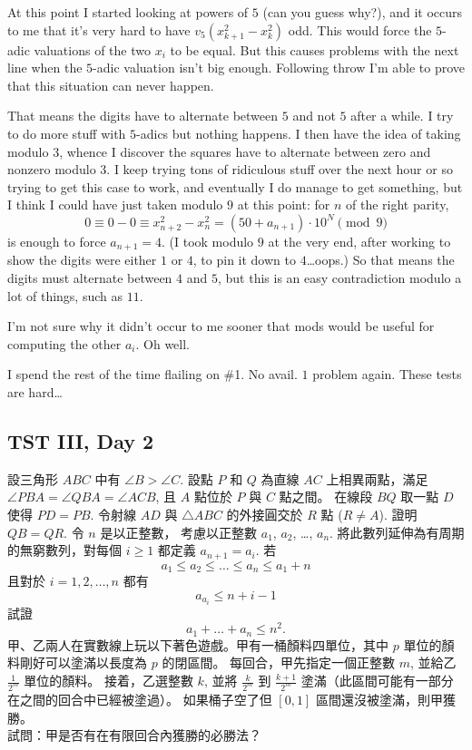 \documentclass[11pt]{scrreprt}
\begin{document}
At this point I started looking at powers of $5$ (can you guess why?), and it occurs to me that it's very hard to have $v_5(x_{k+1}^2 - x_k^2)$ odd. This would force the $5$-adic valuations of the two $x_i$ to be equal. But this causes problems with the next line when the $5$-adic valuation isn't big enough. Following throw I'm able to prove that this situation can never happen.

That means the digits have to alternate between $5$ and not $5$ after a while. I try to do more stuff with $5$-adics but nothing happens. I then have the idea of taking modulo $3$, whence I discover the squares have to alternate between zero and nonzero modulo $3$. I keep trying tons of ridiculous stuff over the next hour or so trying to get this case to work, and eventually I do manage to get something, but I think I could have just taken modulo $9$ at this point: for $n$ of the right parity,
\[ 0 \equiv 0-0 \equiv x_{n+2}^2 - x_n^2 = \left( 50 + a_{n+1} \right) \cdot 10^N \pmod{9} \]
is enough to force $a_{n+1} = 4$. (I took modulo $9$ at the very end, after working to show the digits were either $1$ or $4$, to pin it down to $4$\dots oops.) So that means the digits must alternate between $4$ and $5$, but this is an easy contradiction modulo a lot of things, such as $11$.

I'm not sure why it didn't occur to me sooner that mods would be useful for computing the other $a_i$. Oh well.

I spend the rest of the time flailing on \#1. No avail. $1$ problem again. These tests are hard\dots



\subsection{TST III, Day 2}
\begin{enumerate}
  \setcounter{enumi}{3}
  \ii 設三角形 $ABC$ 中有 $\angle B > \angle C$. 設點 $P$ 和 $Q$ 為直線 $AC$ 上相異兩點，滿足 $\angle PBA = \angle QBA = \angle ACB$, 且 $A$ 點位於 $P$ 與 $C$ 點之間。 在線段 $BQ$ 取一點 $D$ 使得 $PD = PB$.
  令射線 $AD$ 與 $\triangle ABC$ 的外接圓交於 $R$ 點 ($R \neq A$). 證明 $QB = QR$. %
  \ii 令 $n$ 是以正整數， 考慮以正整數 $a_1$, $a_2$, \dots, $a_n$. 將此數列延伸為有周期的無窮數列，對每個 $i \ge 1$ 都定義 $a_{n+1} = a_i$. 若
  \[ a_1 \le a_2 \le \dots \le a_n \le a_1 + n \]
  且對於 $i = 1,2,\dots,n$ 都有
  \[ a_{a_i} \le n+i-1 \]
  試證
  \[ a_1 + \dots + a_n \le n^2. \]
  \ii 甲、乙兩人在實數線上玩以下著色遊戲。甲有一桶顏料四單位，其中 $p$ 單位的顏料剛好可以塗滿以長度為 $p$ 的閉區間。
  每回合，甲先指定一個正整數 $m$, 並給乙 $\frac{1}{2^m}$ 單位的顏料。
  接着，乙選整數 $k$, 並將 $\frac{k}{2^m}$ 到 $\frac{k+1}{2^m}$ 塗滿（此區間可能有一部分在之間的回合中已經被塗過）。
  如果桶子空了但 $[0,1]$ 區間還沒被塗滿，則甲獲勝。 \\
  試問：甲是否有在有限回合內獲勝的必勝法？ %
\end{enumerate}
\end{document}
